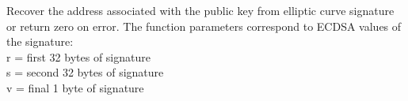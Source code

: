 Recover the address associated with the public key from elliptic curve signature or return zero on error. The function parameters correspond to ECDSA values of the signature:
\\
r = first 32 bytes of signature\\
s = second 32 bytes of signature\\
v = final 1 byte of signature


